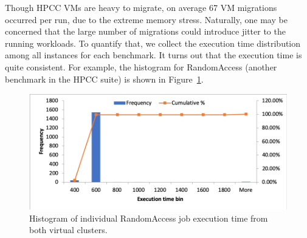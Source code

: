 Though HPCC VMs are heavy to migrate, on average 67 VM migrations occurred per run, due to the extreme memory stress. Naturally, one may be concerned that the large number of migrations could introduce jitter to the running workloads. To quantify that, we collect the execution time distribution among all instances for each benchmark. It turns out that the execution time is quite consistent. For example, the histogram for RandomAccess (another benchmark in the HPCC suite) is shown in Figure~\ref{fig:ra_histogram}.

\begin{figure}[!t]
   \begin{center}
       \includegraphics[width=\columnwidth]{Figures/ra_histogram}
   \end{center}
   \caption{Histogram of individual RandomAccess job execution time from both virtual clusters.}
   \label{fig:ra_histogram}
 \end{figure}




